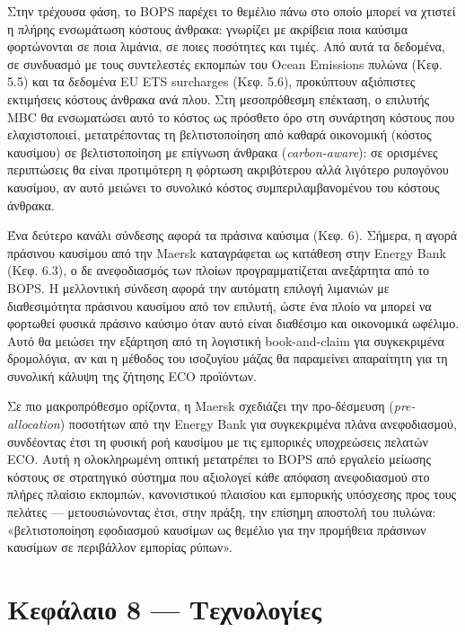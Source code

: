 \documentclass[11pt,a4paper,greek,twoside]{template-xe}
\begin{document}
Στην τρέχουσα φάση, το BOPS παρέχει το θεμέλιο πάνω στο οποίο μπορεί να
χτιστεί η πλήρης ενσωμάτωση κόστους άνθρακα: γνωρίζει με ακρίβεια ποια
καύσιμα φορτώνονται σε ποια λιμάνια, σε ποιες ποσότητες και τιμές. Από
αυτά τα δεδομένα, σε συνδυασμό με τους συντελεστές εκπομπών του Ocean
Emissions πυλώνα (Κεφ. 5.5) και τα δεδομένα EU ETS surcharges (Κεφ.
5.6), προκύπτουν αξιόπιστες εκτιμήσεις κόστους άνθρακα ανά πλου. Στη
μεσοπρόθεσμη επέκταση, ο επιλυτής MBC θα ενσωματώσει αυτό το κόστος ως
πρόσθετο όρο στη συνάρτηση κόστους που ελαχιστοποιεί, μετατρέποντας τη
βελτιστοποίηση από καθαρά οικονομική (κόστος καυσίμου) σε βελτιστοποίηση
με επίγνωση άνθρακα (\emph{carbon-aware}): σε ορισμένες περιπτώσεις θα
είναι προτιμότερη η φόρτωση ακριβότερου αλλά λιγότερο ρυπογόνου
καυσίμου, αν αυτό μειώνει το συνολικό κόστος συμπεριλαμβανομένου του
κόστους άνθρακα.

Ένα δεύτερο κανάλι σύνδεσης αφορά τα πράσινα καύσιμα (Κεφ. 6). Σήμερα, η
αγορά πράσινου καυσίμου από την Maersk καταγράφεται ως κατάθεση στην
Energy Bank (Κεφ. 6.3), ο δε ανεφοδιασμός των πλοίων προγραμματίζεται
ανεξάρτητα από το BOPS. Η μελλοντική σύνδεση αφορά την αυτόματη επιλογή
λιμανιών με διαθεσιμότητα πράσινου καυσίμου από τον επιλυτή, ώστε ένα
πλοίο να μπορεί να φορτωθεί φυσικά πράσινο καύσιμο όταν αυτό είναι
διαθέσιμο και οικονομικά ωφέλιμο. Αυτό θα μειώσει την εξάρτηση από τη
λογιστική book-and-claim για συγκεκριμένα δρομολόγια, αν και η μέθοδος
του ισοζυγίου μάζας θα παραμείνει απαραίτητη για τη συνολική κάλυψη της
ζήτησης ECO προϊόντων.

Σε πιο μακροπρόθεσμο ορίζοντα, η Maersk σχεδιάζει την προ-δέσμευση
(\emph{pre-allocation}) ποσοτήτων από την Energy Bank για συγκεκριμένα
πλάνα ανεφοδιασμού, συνδέοντας έτσι τη φυσική ροή καυσίμου με τις
εμπορικές υποχρεώσεις πελατών ECO. Αυτή η ολοκληρωμένη οπτική μετατρέπει
το BOPS από εργαλείο μείωσης κόστους σε στρατηγικό σύστημα που αξιολογεί
κάθε απόφαση ανεφοδιασμού στο πλήρες πλαίσιο εκπομπών, κανονιστικού
πλαισίου και εμπορικής υπόσχεσης προς τους πελάτες --- μετουσιώνοντας
έτσι, στην πράξη, την επίσημη αποστολή του πυλώνα: «βελτιστοποίηση
εφοδιασμού καυσίμων ως θεμέλιο για την προμήθεια πράσινων καυσίμων σε
περιβάλλον εμπορίας ρύπων».

\pagebreak

\chapter{Κεφάλαιο 8 ---
Τεχνολογίες}\label{ux3baux3b5ux3c6ux3acux3bbux3b1ux3b9ux3bf-8-ux3c4ux3b5ux3c7ux3bdux3bfux3bbux3bfux3b3ux3afux3b5ux3c2}
\end{document}
